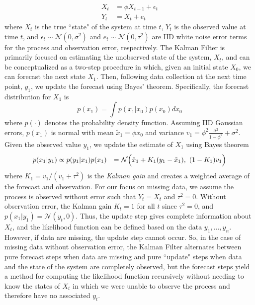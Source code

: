 \documentclass[12pt,english]{article} %
\begin{document}
\begin{equation}
    \begin{aligned}
        X_t &= \phi X_{t-1} + \epsilon_t \\Y_t &= X_t + e_t
    \end{aligned}
\end{equation}
where $X_t$ is the true ``state" of the system at time $t$, $Y_t$ is the observed value at time $t$, and $\epsilon_t \sim \mathcal{N}(0, \sigma^2)$ and $e_t \sim \mathcal{N}(0, \tau^2)$ are IID white noise error terms for the process and observation error, respectively. The Kalman Filter is primarily focused on estimating the unobserved state of the system, $X_t$, and can be conceptualized as a two-step procedure in which, given an initial state $X_0$, we can forecast the next state $X_1$. Then, following data collection at the next time point, $y_1$, we update the forecast using Bayes' theorem. Specifically, the forecast distribution for $X_1$ is
\begin{equation}
    p(x_1) = \int p(x_1 | x_0)p(x_0)dx_0
\end{equation}
where $p(\cdot)$ denotes the probability density function. Assuming IID Gaussian errors, $p(x_1)$ is normal with mean ${\tilde x}_1 = \phi x_0$ and variance $v_1 = \phi^2 \frac{\sigma^2}{1 - \phi^2} + \sigma^2$. Given the observed value $y_1$, we update the estimate of $X_1$ using Bayes theorem
\begin{equation}
    \begin{aligned}
        p(x_1 | y_1) &\propto p(y_1 | x_1) p(x_1)
        &= \mathcal{N}\Bigl(\tilde x_1 + K_1(y_1 - \tilde x_1),\ (1 - K_1)v_1 \Bigr)
    \end{aligned} 
\end{equation}
where $K_1 = v_1 / (v_1 + \tau^2)$ is the \textit{Kalman gain} and creates a weighted average of the forecast and observation. %
For our focus on missing data, we assume the process is observed without error such that $Y_t = X_t$ and $\tau^2 = 0$. Without observation error, the Kalman gain $K_t = 1$ for all $t$ since $\tau^2 = 0$, and $p(x_1 | y_1) = \mathcal{N}(y_t, 0)$. Thus, the update step gives complete information about $X_t$, and the likelihood function can be defined based on the data $y_1,...,y_n$. However, if data are missing, the update step cannot occur. So, in the case of missing data without observation error, the Kalman Filter alternates between pure forecast steps when data are missing and pure ``update" steps when data and the state of the system are completely observed, but the forecast steps yield a method for computing the likelihood function recursively without needing to know the states of $X_t$ in which we were unable to observe the process and therefore have no associated $y_t$.
\end{document}
